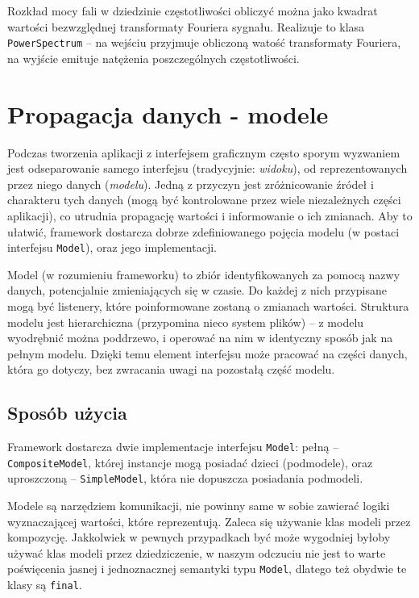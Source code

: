 Rozkład mocy fali w dziedzinie częstotliwości obliczyć można jako kwadrat wartości bezwzględnej
transformaty Fouriera sygnału. Realizuje to klasa \texttt{PowerSpectrum} -- na wejściu przyjmuje
obliczoną watość transformaty Fouriera, na wyjście emituje natężenia poszczególnych częstotliwości.


\section{Propagacja danych - modele}

Podczas tworzenia aplikacji z interfejsem graficznym często sporym wyzwaniem jest odseparowanie
samego interfejsu (tradycyjnie: \emph{widoku}), od reprezentowanych przez niego danych
(\emph{modelu}). Jedną z przyczyn jest zróżnicowanie źródeł i charakteru tych danych (mogą być
kontrolowane przez wiele niezależnych części aplikacji), co utrudnia propagację wartości i
informowanie o ich zmianach. Aby to ułatwić, framework dostarcza dobrze zdefiniowanego pojęcia
modelu (w postaci interfejsu \texttt{Model}), oraz jego implementacji.

Model (w rozumieniu frameworku) to zbiór identyfikowanych za pomocą nazwy danych, potencjalnie
zmieniających się w czasie. Do każdej z nich przypisane mogą być listenery, które poinformowane
zostaną o zmianach wartości. Struktura modelu jest hierarchiczna (przypomina nieco system plików) --
z modelu wyodrębnić można poddrzewo, i operować na nim w identyczny sposób jak na pełnym modelu.
Dzięki temu element interfejsu może pracować na części danych, która go dotyczy, bez zwracania uwagi
na pozostałą część modelu.

\subsection{Sposób użycia}

Framework dostarcza dwie implementacje interfejsu \texttt{Model}: pełną -- \texttt{CompositeModel},
której instancje mogą posiadać dzieci (podmodele), oraz uproszczoną -- \texttt{SimpleModel}, która
nie dopuszcza posiadania podmodeli.

Modele są narzędziem komunikacji, nie powinny same w sobie zawierać logiki wyznaczającej wartości,
które reprezentują. Zaleca się używanie klas modeli przez kompozycję. Jakkolwiek w pewnych
przypadkach być może wygodniej byłoby używać klas modeli przez dziedziczenie, w naszym odczuciu nie
jest to warte poświęcenia jasnej i jednoznacznej semantyki typu \texttt{Model}, dlatego też obydwie
te klasy są \texttt{final}.

